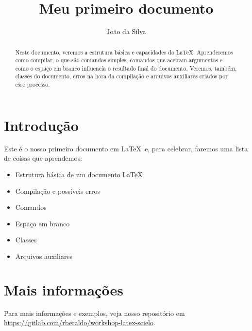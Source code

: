 \documentclass[11pt,a4paper]{article}
\title{Meu primeiro documento}
\author{João da Silva}
\begin{document}
\frenchspacing

\maketitle

\begin{abstract}
  Neste documento, veremos a estrutura básica e capacidades do \LaTeX.
  Aprenderemos como compilar, o que são comandos simples, comandos que aceitam
  argumentos e como o espaço em branco influencia o resultado final do
  documento. Veremos, também, classes do documento, erros na hora da compilação
  e arquivos auxiliares criados por esse processo.
\end{abstract}

\tableofcontents

\section{Introdução}

Este é o nosso primeiro documento em \LaTeX\ e, para celebrar, faremos uma
lista de coisas que aprendemos:

\begin{itemize}
  \item Estrutura básica de um documento \LaTeX
  \item Compilação e possíveis erros
  \item Comandos
  \item Espaço em branco
  \item Classes
  \item Arquivos auxiliares
\end{itemize}

\section{Mais informações}

Para mais informações e exemplos, veja nosso repositório em
\url{https://gitlab.com/rberaldo/workshop-latex-scielo}.
\end{document}
